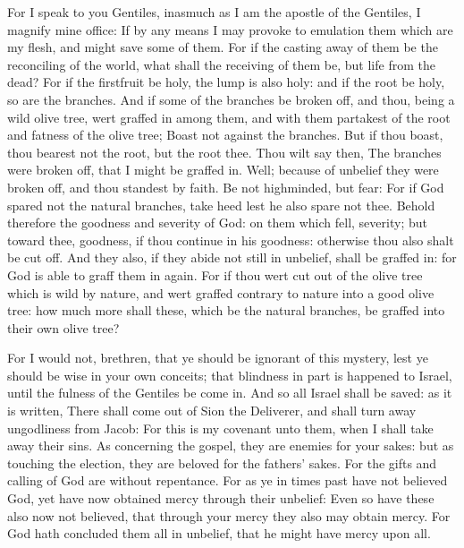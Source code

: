  For I speak to you Gentiles, inasmuch as I am the apostle
of the Gentiles, I magnify mine office:  If by any means I
may provoke to emulation them which are my flesh, and might save some of
them.  For if the casting away of them be the reconciling
of the world, what shall the receiving of them be, but life from the
dead?  For if the firstfruit be holy, the lump is also
holy: and if the root be holy, so are the branches.  And if
some of the branches be broken off, and thou, being a wild olive tree,
wert graffed in among them, and with them partakest of the root and
fatness of the olive tree;  Boast not against the branches.
But if thou boast, thou bearest not the root, but the root thee.
 Thou wilt say then, The branches were broken off, that I
might be graffed in.  Well; because of unbelief they were
broken off, and thou standest by faith. Be not highminded, but fear:
 For if God spared not the natural branches, take heed lest
he also spare not thee.  Behold therefore the goodness and
severity of God: on them which fell, severity; but toward thee,
goodness, if thou continue in his goodness: otherwise thou also shalt be
cut off.  And they also, if they abide not still in
unbelief, shall be graffed in: for God is able to graff them in again.
 For if thou wert cut out of the olive tree which is wild
by nature, and wert graffed contrary to nature into a good olive tree:
how much more shall these, which be the natural branches, be graffed
into their own olive tree?

 For I would not, brethren, that ye should be ignorant of
this mystery, lest ye should be wise in your own conceits; that
blindness in part is happened to Israel, until the fulness of the
Gentiles be come in.  And so all Israel shall be saved: as
it is written, There shall come out of Sion the Deliverer, and shall
turn away ungodliness from Jacob:  For this is my covenant
unto them, when I shall take away their sins.  As
concerning the gospel, they are enemies for your sakes: but as touching
the election, they are beloved for the fathers' sakes.  For
the gifts and calling of God are without repentance.  For
as ye in times past have not believed God, yet have now obtained mercy
through their unbelief:  Even so have these also now not
believed, that through your mercy they also may obtain mercy.
 For God hath concluded them all in unbelief, that he might
have mercy upon all.

